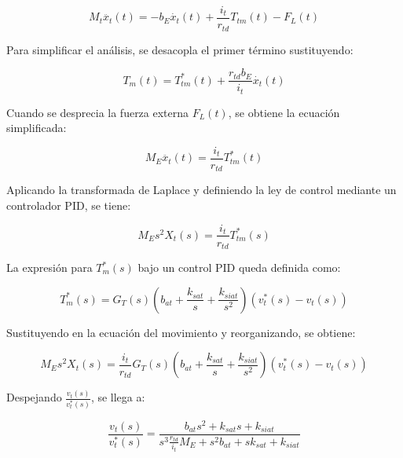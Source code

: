 \documentclass{article}
\begin{document}
            \begin{equation}
                M_t \ddot{x_{t}}(t) = - b_E \dot{x_{t}}(t) + \frac{i_t}{r_{td}} T_{tm}(t) - F_{L}(t) 
            \end{equation}
            
            Para simplificar el análisis, se desacopla el primer término sustituyendo:
            
            \begin{equation}
            T_m(t) = T_{tm}^*(t) + \frac{r_{td} b_E}{i_t} \dot{x_t}(t)
            \end{equation}
            
            Cuando se desprecia la fuerza externa $F_{L}(t)$, se obtiene la ecuación simplificada:
            
            \begin{equation}
                M_E \ddot{x_{t}}(t) =  \frac{i_t}{r_{td}} T_{tm}^*(t) 
            \end{equation}
            
            Aplicando la transformada de Laplace y definiendo la ley de control mediante un controlador PID, se tiene:
            
            \begin{equation}
                M_E s^2 X_t(s) =  \frac{i_t}{r_{td}} T_{tm}^*(s)
            \end{equation}
            
            La expresión para $T_m^*(s)$ bajo un control PID queda definida como:
            
            \begin{equation}
                T_m^*(s) = G_T(s)\left( b_{at} + \frac{k_{sat}}{s} + \frac{k_{siat}}{s^2} \right)(v_t^*(s) - v_t(s))
            \end{equation}
            
            Sustituyendo en la ecuación del movimiento y reorganizando, se obtiene:
            
            \begin{equation}
                M_E s^2 X_t(s) =  \frac{i_t}{r_{td}} G_T(s)\left( b_{at} + \frac{k_{sat}}{s} + \frac{k_{siat}}{s^2} \right)(v_t^*(s) - v_t(s))
            \end{equation}
            
            Despejando $\frac{v_t(s)}{v_t^*(s)}$, se llega a:
            
            \begin{equation}
                \frac{v_t(s)}{v_t^*(s)} = \frac{b_{at} s^2 + k_{sat}s + k_{siat}}{s^3 \frac{r_{td}}{i_t}M_E + s^2 b_{at} + s k_{sat} + k_{siat}}
            \end{equation}
            
\end{document}
